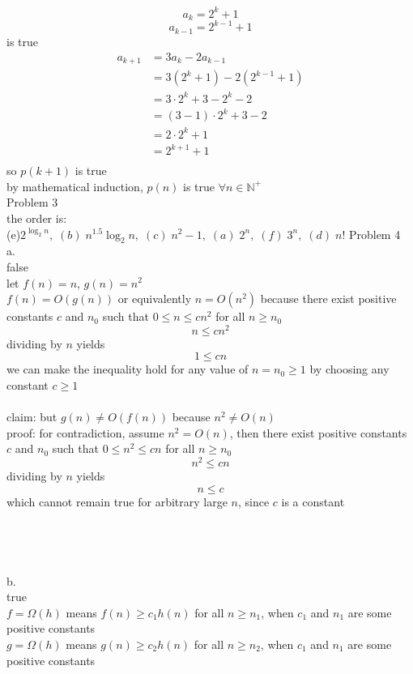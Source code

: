 \documentclass[12pt,border=4pt,multi]{article}%
\begin{document}
\[a_k = 2^k + 1\]
\[a_{k - 1} = 2^{k - 1} + 1\]
is true
\begin{align*}
    a_{k + 1} &= 3a_k - 2a_{k - 1}\\
    &= 3(2^k + 1) - 2(2^{k - 1} + 1)\\
    &= 3 \cdot 2^k + 3 - 2^k - 2\\
    &= (3 - 1)\cdot 2^k + 3 - 2\\
    &= 2\cdot 2^k + 1\\
    &= 2^{k + 1} + 1\\
\end{align*}
so $p(k + 1)$ is true\\
by mathematical induction, $p(n)$ is true $\forall n \in \mathbb{N}^+$\\
\newpage
\noindent
Problem 3\\
the order is:\\
{\large 
(e)\;$2^{\log_2 n},\;
(b)\;n^{1.5} \log_2 n,\;
(c)\;n^2 - 1,\;
(a)\;2^n,\;
(f)\;3^n,\;
(d)\;n!
$}
\newpage
\noindent
Problem 4\\
a.\\
false\\ 
let $f(n) = n$, $g(n) = n^2$\\
$f(n) = O(g(n))$ or equivalently $n = O(n^2)$ because there exist positive constants $c$ and $n_0$ such that $0 \leq n \leq c n^2$ for all $n \geq n_0$
\[n \leq c n^2\]
dividing by $n$ yields
\[1 \leq c n\]
we can make the inequality hold for any value of $n = n_0 \geq 1$ by choosing any constant $c \geq 1$\\
\\
claim: but $g(n) \not= O(f(n))$ because $n^2 \not= O(n)$\\
proof: for contradiction, assume $n^2 = O(n)$, then there exist positive constants $c$ and $n_0$ such that $0 \leq n^2 \leq c n$ for all $n \geq n_0$\\
\[n^2 \leq c n\]
dividing by $n$ yields
\[n \leq c\]
which cannot remain true for arbitrary large $n$, since $c$ is a constant\\
\\
\\
\\
\\
b.\\ 
true\\
$f = \Omega(h)$ means $f(n) \geq c_1 h(n)$ for all $n \geq n_1$, when $c_1$ and $n_1$ are some positive constants\\
$g = \Omega(h)$ means $g(n) \geq c_2 h(n)$ for all $n \geq n_2$, when $c_1$ and $n_1$ are some positive constants
\end{document}
